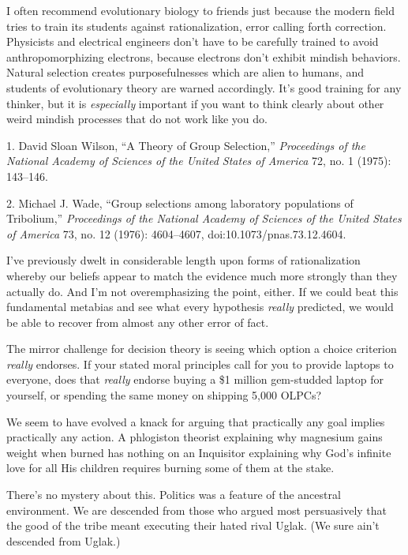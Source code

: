 {
 I often recommend evolutionary biology to friends just because the
modern field tries to train its students against rationalization, error
calling forth correction. Physicists and electrical engineers
don't have to be carefully trained to avoid
anthropomorphizing electrons, because electrons don't
exhibit mindish behaviors. Natural selection creates purposefulnesses
which are alien to humans, and students of evolutionary theory are
warned accordingly. It's good training for any thinker,
but it is \textit{especially} important if you want to think clearly
about other weird mindish processes that do not work like you do.}

\myendsectiontext


\bigskip

{
 1. David Sloan Wilson, ``A Theory of Group
Selection,'' \textit{Proceedings of the National
Academy of Sciences of the United States of America} 72, no. 1 (1975):
143--146.}

{
 2. Michael J. Wade, ``Group selections among
laboratory populations of Tribolium,''
\textit{Proceedings of the National Academy of Sciences of the United
States of America} 73, no. 12 (1976): 4604--4607,
doi:10.1073/pnas.73.12.4604.}


{
 I've previously dwelt in considerable length upon
forms of rationalization whereby our beliefs appear to match the
evidence much more strongly than they actually do. And
I'm not overemphasizing the point, either. If we could
beat this fundamental metabias and see what every hypothesis
\textit{really} predicted, we would be able to recover from almost any
other error of fact. }

{
 The mirror challenge for decision theory is seeing which option a
choice criterion \textit{really} endorses. If your stated moral
principles call for you to provide laptops to everyone, does that
\textit{really} endorse buying a \$1 million gem-studded laptop for
yourself, or spending the same money on shipping 5,000 OLPCs?}

{
 We seem to have evolved a knack for arguing that practically any
goal implies practically any action. A phlogiston theorist explaining
why magnesium gains weight when burned has nothing on an Inquisitor
explaining why God's infinite love for all His children
requires burning some of them at the stake.}

{
 There's no mystery about this. Politics was a
feature of the ancestral environment. We are descended from those who
argued most persuasively that the good of the tribe meant executing
their hated rival Uglak. (We sure ain't descended from
Uglak.)}

